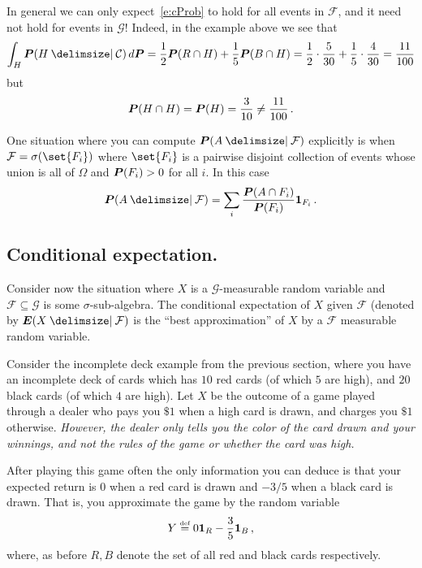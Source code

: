 \begin{remark}
  In general we can only expect~\eqref{e:cProb} to hold for all events in $\mathcal F$, and it need not hold for events in $\mathcal G$!
  Indeed, in the example above we see that
  \begin{equation*}
    \int_H \P( H \given \mathcal C) \, d\P
      = \frac{1}{2} \P(R \cap H) + \frac{1}{5} \P( B \cap H )
      = \frac{1}{2} \cdot \frac{5}{30} + \frac{1}{5} \cdot \frac{4}{30}
      = \frac{11}{100}
  \end{equation*}
  but
  \begin{equation*}
      \P(H \cap H) = \P(H) = \frac{3}{10} \neq \frac{11}{100}\,.
  \end{equation*}
\end{remark}

\begin{remark}
  One situation where you can compute $\P( A \given \mathcal F)$ explicitly is when $\mathcal F = \sigma( \set{F_i} )$ where $\set{F_i}$ is a pairwise disjoint collection of events whose union is all of $\Omega$ and $\P(F_i) > 0 $ for all $i$.
  In this case
  \begin{equation*}
    \P(A \given \mathcal F)
      = \sum_i \frac{\P( A \cap F_i )}{\P(F_i)} \one_{F_i} \,.
  \end{equation*}
\end{remark}

\subsection{Conditional expectation.}

Consider now the situation where $X$ is a $\mathcal G$-measurable random variable and $\mathcal F \subseteq \mathcal G$ is some $\sigma$-sub-algebra.
The conditional expectation of $X$ given $\mathcal F$ (denoted by $\E( X \given \mathcal F)$ is the ``best approximation'' of $X$ by a $\mathcal F$ measurable random variable.

Consider the incomplete deck example from the previous section, where you have an incomplete deck of cards which has $10$ red cards (of which $5$ are high), and $20$ black cards (of which $4$ are high).
Let $X$ be the outcome of a game played through a dealer who pays you $\$1$ when a high card is drawn, and charges you $\$1$ otherwise.
\emph{However, the dealer only tells you the color of the card drawn and your winnings, and not the rules of the game or whether the card was high.}

After playing this game often the only information you can deduce is that your expected return is $0$ when a red card is drawn and $-3/5$ when a black card is drawn.
That is, you approximate the game by the random variable
\begin{equation*}
  Y \defeq 0 \one_R - \frac{3}{5} \one_B\,,
\end{equation*}
where, as before $R, B$ denote the set of all red and black cards respectively. 

